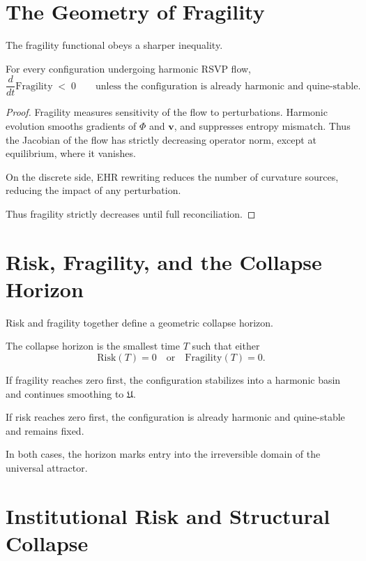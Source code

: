 \section{The Geometry of Fragility}

The fragility functional obeys a sharper inequality.

\begin{theorem}
For every configuration undergoing harmonic RSVP flow,
\[
\frac{d}{dt}\mathrm{Fragility}
  \;<\; 0
\qquad
\text{unless the configuration is already harmonic and quine-stable.}
\]
\end{theorem}

\begin{proof}
Fragility measures sensitivity of the flow to perturbations.
Harmonic evolution smooths gradients of $\Phi$ and $\mathbf{v}$, and
suppresses entropy mismatch.  
Thus the Jacobian of the flow has strictly decreasing operator norm,
except at equilibrium, where it vanishes.

On the discrete side, EHR rewriting reduces the number of curvature
sources, reducing the impact of any perturbation.

Thus fragility strictly decreases until full reconciliation.
\end{proof}

\section{Risk, Fragility, and the Collapse Horizon}

Risk and fragility together define a geometric collapse horizon.

\begin{definition}
The collapse horizon is the smallest time $T$ such that either
\[
\mathrm{Risk}(T) = 0
\quad\text{or}\quad
\mathrm{Fragility}(T) = 0.
\]
\end{definition}

If fragility reaches zero first, the configuration stabilizes into a
harmonic basin and continues smoothing to $\mathfrak{U}$.

If risk reaches zero first, the configuration is already harmonic and
quine-stable and remains fixed.

In both cases, the horizon marks entry into the irreversible domain of
the universal attractor.

\section{Institutional Risk and Structural Collapse}

